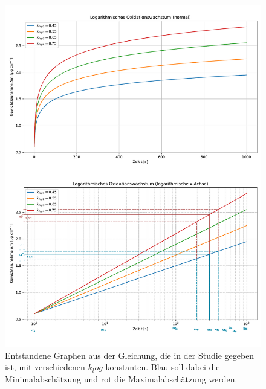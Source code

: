 \onecolumn
\begin{figure}
    \includegraphics[width=\textwidth, page=2]{img/21/Plots_oxi-eingezeichnet.pdf}
    \caption{Entstandene Graphen aus der Gleichung, die in der Studie gegeben ist, mit verschiedenen $k_log$ konstanten. Blau soll dabei die Minimalabschätzung und rot die Maximalabschätzung werden.}
    \label{fig:log_gezeichnet}
\end{figure}
\twocolumn